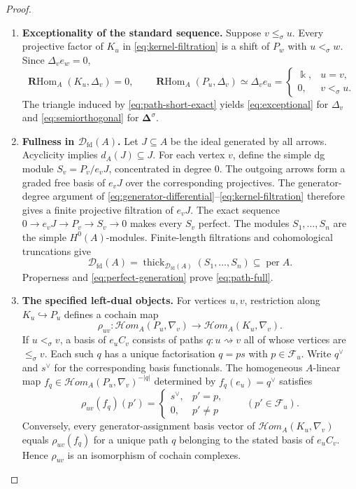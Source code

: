 \documentclass[11pt,a4paper]{article}
\newcommand{\D}{\mathcal D}
\newcommand{\RR}{\mathbf{R}}
\newcommand{\std}{\Delta}
\newcommand{\costd}{\nabla}
\newcommand{\dgHom}{\mathcal{H}\!om}
\DeclareMathOperator{\fd}{fd}
\DeclareMathOperator{\RHom}{\RR Hom}
\DeclareMathOperator{\thick}{thick}
\DeclareMathOperator{\per}{per}
\theoremstyle{plain}
\theoremstyle{definition}
\numberwithin{equation}{section}
\begin{document}
\begin{proof}
\begin{enumerate}[label=\textbf{\arabic*.},ref=\arabic*]
\item\label{step:exceptional}
\textbf{Exceptionality of the standard sequence.}
Suppose $v\leq_\sigma u$. Every projective factor of $K_u$ in
\eqref{eq:kernel-filtration} is a shift of $P_w$ with
$u<_\sigma w$. Since $\std_v e_w=0$,
\[
 \RHom_A(K_u,\std_v)=0,\qquad
 \RHom_A(P_u,\std_v)\simeq\std_v e_u
 =
 \begin{cases}\Bbbk,&u=v,\\0,&v<_\sigma u.\end{cases}
\]
The triangle induced by \eqref{eq:path-short-exact} yields
\eqref{eq:exceptional} for $\std_v$ and
\eqref{eq:semiorthogonal} for $\boldsymbol\std^\sigma$.

\item\label{step:fullness}
\textbf{Fullness in $\D_{\fd}(A)$.}
Let $J\subseteq A$ be the ideal generated by all arrows.
Acyclicity implies $d_A(J)\subseteq J$.
For each vertex $v$, define the simple dg module
$S_v=P_v/e_vJ$, concentrated in degree $0$.
The outgoing arrows form a graded free basis of $e_vJ$ over the
corresponding projectives. The generator-degree argument of
\eqref{eq:generator-differential}--\eqref{eq:kernel-filtration}
therefore gives a finite projective filtration of $e_vJ$.
The exact sequence
$0\to e_vJ\to P_v\to S_v\to0$ makes every $S_v$ perfect.
The modules $S_1,\ldots,S_n$ are the simple $H^0(A)$-modules.
Finite-length filtrations and cohomological truncations give
\[
 \D_{\fd}(A)=\thick_{\D_{\fd}(A)}(S_1,\ldots,S_n)\subseteq\per A.
\]
Properness and \eqref{eq:perfect-generation} prove \eqref{eq:path-full}.

\item\label{step:pairing}
\textbf{The specified left-dual objects.}
For vertices $u,v$, restriction along $K_u\hookrightarrow P_u$ defines
a cochain map
\begin{equation}\label{eq:restriction}
 \rho_{uv}:\dgHom_A(P_u,\costd_v)
       \longrightarrow\dgHom_A(K_u,\costd_v).
\end{equation}
If $u<_\sigma v$, a basis of $e_uC_v$ consists of paths
$q:u\rightsquigarrow v$ all of whose vertices are
$\leq_\sigma v$. Each such $q$ has a unique factorisation
$q=ps$ with $p\in\mathcal F_u$.
Write $q^\vee$ and $s^\vee$ for the corresponding basis functionals.
The homogeneous $A$-linear map
$f_q\in\dgHom_A(P_u,\costd_v)^{-|q|}$ determined by
$f_q(e_u)=q^\vee$ satisfies
\begin{equation}\label{eq:restriction-basis}
 \rho_{uv}(f_q)(p')=
 \begin{cases}
 s^\vee,&p'=p,\\
 0,&p'\neq p
 \end{cases}
 \qquad(p'\in\mathcal F_u).
\end{equation}
Conversely, every generator-assignment basis vector of
$\dgHom_A(K_u,\costd_v)$ equals $\rho_{uv}(f_q)$ for a unique
path $q$ belonging to the stated basis of $e_uC_v$.
Hence $\rho_{uv}$ is an isomorphism of cochain complexes.


\end{enumerate}
\end{proof}
\end{document}
